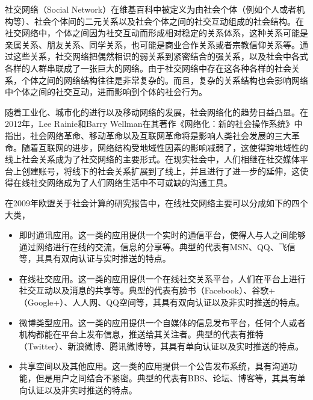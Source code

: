 社交网络（Social Network）在维基百科中被定义为由社会个体（例如个人或者机构等）、社会个体间的二元关系以及社会个体之间的社交互动组成的社会结构。在社交网络中，个体之间因为社交互动而形成相对稳定的关系体系，这种关系可能是亲属关系、朋友关系、同学关系，也可能是商业合作关系或者宗教信仰关系等。通过这些关系，社交网络把偶然相识的弱关系到紧密结合的强关系，以及社会中各式各样的人群串联成了一张巨大的网络。由于社交网络中存在这各种各样的社会关系，个体之间的网络结构往往是非常复杂的。而且，复杂的关系结构也会影响网络中个体之间的社交互动，进而影响到个体的社会行为。

随着工业化、城市化的进行以及移动网络的发展，社会网络化的趋势日益凸显。在2012年，Lee Rainie和Barry Wellman在其著作《网络化：新的社会操作系统》中指出，社会网络革命、移动革命以及互联网革命将是影响人类社会发展的三大革命。随着互联网的进步，网络结构受地域性因素的影响减弱了，这使得跨地域性的线上社会关系成为了社交网络的主要形式。在现实社会中，人们相继在社交媒体平台上创建账号，将线下的社会关系扩展到了线上，并且进行了进一步的延伸，这使得在线社交网络成为了人们网络生活中不可或缺的沟通工具。

在2009年欧盟关于社会计算的研究报告中，在线社交网络主要可以分成如下的四个大类，
\begin{itemize}
	\item 即时通讯应用。这一类的应用提供一个实时的通信平台，使得人与人之间能够通过网络进行在线的交流，信息的分享等。典型的代表有MSN、QQ、飞信等，其具有双向认证与实时推送的特点。
	\item 在线社交应用。这一类的应用提供一个在线社交关系平台，人们在平台上进行社交互动以及消息的共享等。典型的代表有脸书（Facebook）、谷歌+（Google+）、人人网、QQ空间等，其具有双向认证以及非实时推送的特点。
	\item 微博类型应用。这一类的应用提供一个自媒体的信息发布平台，任何个人或者机构都能在平台上发布信息，推送给其关注者。典型的代表有推特（Twitter）、新浪微博、腾讯微博等，其具有单向认证以及实时推送的特点。
	\item 共享空间以及其他应用。这一类的应用提供一个公告发布系统，具有沟通功能，但是用户之间结合不紧密。典型的代表有BBS、论坛、博客等，其具有单向认证以及非实时推送的特点。
\end{itemize}

